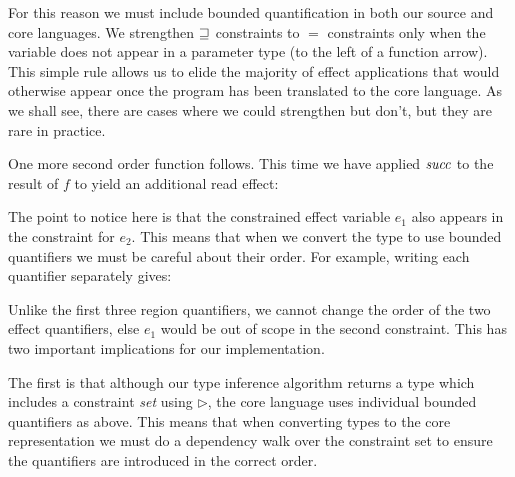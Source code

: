 
For this reason we must include bounded quantification in both our source and core languages. We strengthen $\sqsupseteq$ constraints to $=$ constraints only when the variable does not appear in a parameter type (to the left of a function arrow). This simple rule allows us to elide the majority of effect applications that would otherwise appear once the program has been translated to the core language. As we shall see, there are cases where we could strengthen but don't, but they are rare in practice.

One more second order function follows. This time we have applied $\operatorname{\mathit{succ}}$ to the result of $f$ to yield an additional read effect:


The point to notice here is that the constrained effect variable $e_1$ also appears in the constraint for $e_2$. This means that when we convert the type to use bounded quantifiers we must be careful about their order. For example, writing each quantifier separately gives:


Unlike the first three region quantifiers, we cannot change the order of the two effect quantifiers, else $e_1$ would be out of scope in the second constraint. This has two important implications for our implementation. 

The first is that although our type inference algorithm returns a type which includes a constraint \emph{set} using $\rhd$, the core language uses individual bounded quantifiers as above. This means that when converting types to the core representation we must do a dependency walk over the constraint set to ensure the quantifiers are introduced in the correct order.

